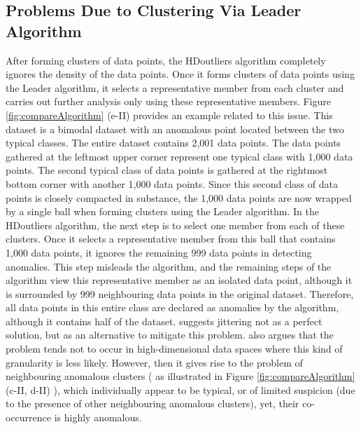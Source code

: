 \documentclass[11pt,a4paper,]{article}
\theoremstyle{definition}
\theoremstyle{definition}
\theoremstyle{definition}
\theoremstyle{remark}
\begin{document}
\hypertarget{problems-due-to-clustering-via-leader-algorithm}{%
\subsection{Problems Due to Clustering Via Leader Algorithm}\label{problems-due-to-clustering-via-leader-algorithm}}

\label{sec:cluster_FR}

After forming clusters of data points, the HDoutliers algorithm completely ignores the density of the data points. Once it forms clusters of data points using the Leader algorithm, it selects a representative member from each cluster and carries out further analysis only using these representative members. Figure \ref{fig:compareAlgorithm} (e-II) provides an example related to this issue. This dataset is a bimodal dataset with an anomalous point located between the two typical classes. The entire dataset contains 2,001 data points. The data points gathered at the leftmost upper corner represent one typical class with 1,000 data points. The second typical class of data points is gathered at the rightmost bottom corner with another 1,000 data points. Since this second class of data points is closely compacted in substance, the 1,000 data points are now wrapped by a single ball when forming clusters using the Leader algorithm. In the HDoutliers algorithm, the next step is to select one member from each of these clusters. Once it selects a representative member from this ball that contains 1,000 data points, it ignores the remaining 999 data points in detecting anomalies. This step misleads the algorithm, and the remaining steps of the algorithm view this representative member as an isolated data point, although it is surrounded by 999 neighbouring data points in the original dataset. Therefore, all data points in this entire class are declared as anomalies by the algorithm, although it contains half of the dataset. \textcite{unwin2019multivariate} suggests jittering not as a perfect solution, but as an alternative to mitigate this problem. \textcite{unwin2019multivariate} also argues that the problem tends not to occur in high-dimensional data spaces where this kind of granularity is less likely. However, then it gives rise to the problem of neighbouring anomalous clusters ( as illustrated in Figure \ref{fig:compareAlgorithm} (c-II, d-II) ), which individually appear to be typical, or of limited suspicion (due to the presence of other neighbouring anomalous clusters), yet, their co-occurrence is highly anomalous.
\end{document}
